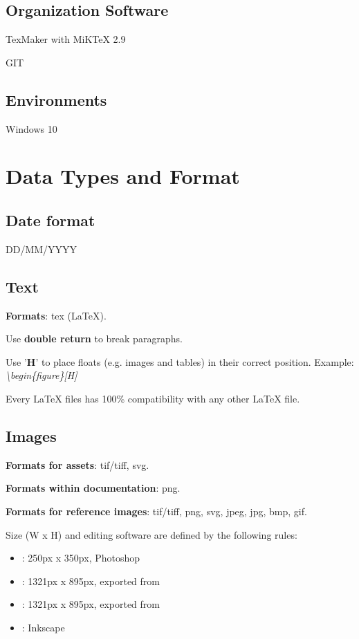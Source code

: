 \documentclass[12pt]{article}
\begin{document}
\subsection{Organization Software}
TexMaker with MiKTeX 2.9

GIT

\subsection{Environments}
Windows 10

\section{Data Types and Format}

\subsection{Date format}
DD/MM/YYYY

\subsection{Text}
\textbf{Formats}: tex (LaTeX).


Use \textbf{double return} to break paragraphs.

Use '\textbf{H}' to place floats (e.g. images and tables) in their correct position. Example: \textit{\textbackslash{}begin\{figure\}[H]}

Every LaTeX files has 100\% compatibility with any other LaTeX file.

\subsection{Images}
\textbf{Formats for assets}: tif/tiff, svg.

\textbf{Formats within documentation}: png.

\textbf{Formats for reference images}: tif/tiff, png, svg, jpeg, jpg, bmp, gif.

Size (W x H) and editing software are defined by the following rules:
\begin{itemize}
	\item \textbf{}: 250px x 350px, Photoshop
	\item \textbf{}: 1321px x 895px, exported from 
	\item \textbf{}: 1321px x 895px, exported from 
	\item \textbf{}: Inkscape
\end{itemize}
\end{document}
